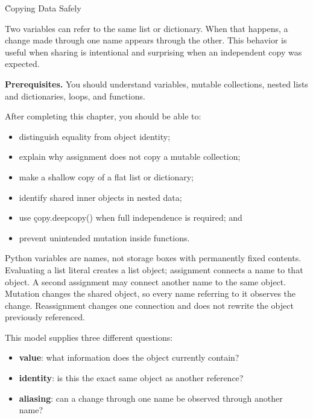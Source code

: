 
\h{Copying Data Safely}
\label{ch:09}

Two variables can refer to the same list or dictionary. When that happens, a
change made through one name appears through the other. This behavior is useful
when sharing is intentional and surprising when an independent copy was
expected.

\begin{NoteBox}
\textbf{Prerequisites.} You should understand variables, mutable collections,
nested lists and dictionaries, loops, and functions.
\end{NoteBox}

\begin{tcolorbox}[title=Learning outcomes,colframe=orange,colback=white,arc=2mm]
After completing this chapter, you should be able to:
\begin{itemize}
    \item distinguish equality from object identity;
    \item explain why assignment does not copy a mutable collection;
    \item make a shallow copy of a flat list or dictionary;
    \item identify shared inner objects in nested data;
    \item use \c{copy.deepcopy()} when full independence is required; and
    \item prevent unintended mutation inside functions.
\end{itemize}
\end{tcolorbox}


Python variables are names, not storage boxes with permanently fixed contents.
Evaluating a list literal creates a list object; assignment connects a name to
that object. A second assignment may connect another name to the same object.
Mutation changes the shared object, so every name referring to it observes the
change. Reassignment changes one connection and does not rewrite the object
previously referenced.

This model supplies three different questions:
\begin{itemize}
    \item \textbf{value}: what information does the object currently contain?
    \item \textbf{identity}: is this the exact same object as another reference?
    \item \textbf{aliasing}: can a change through one name be observed through
          another name?
\end{itemize}

